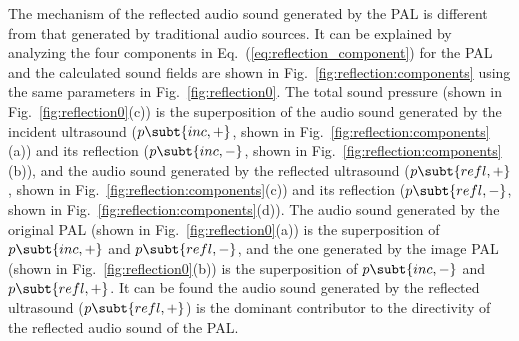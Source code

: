 The mechanism of the reflected audio sound generated by the PAL is different from that generated by traditional audio sources. 
It can be explained by analyzing the four components in Eq.~(\ref{eq:reflection_component}) for the PAL and the calculated sound fields are shown in Fig.~\ref{fig:reflection:components} using the same parameters in Fig.~\ref{fig:reflection0}. 
The total sound pressure (shown in Fig.~\ref{fig:reflection0}(c)) is the superposition of the audio sound generated by the incident ultrasound ($p\subt{inc,+}$, shown in Fig.~\ref{fig:reflection:components}(a)) and its reflection ($p\subt{inc,-}$, shown in Fig.~\ref{fig:reflection:components}(b)), 
and the audio sound generated by the reflected ultrasound ($p\subt{refl,+}$, shown in Fig.~\ref{fig:reflection:components}(c)) and its reflection ($p\subt{refl,-}$, shown in Fig.~\ref{fig:reflection:components}(d)). 
The audio sound generated by the original PAL (shown in Fig.~\ref{fig:reflection0}(a)) is the superposition of $p\subt{inc,+}$ and $p\subt{refl,-}$, and the one generated by the image PAL (shown in Fig.~\ref{fig:reflection0}(b)) is the superposition of $p\subt{inc,-}$ and $p\subt{refl,+}$. 
It can be found the audio sound generated by the reflected ultrasound ($p\subt{refl,+}$) is the dominant contributor to the directivity of the reflected audio sound of the PAL. 
